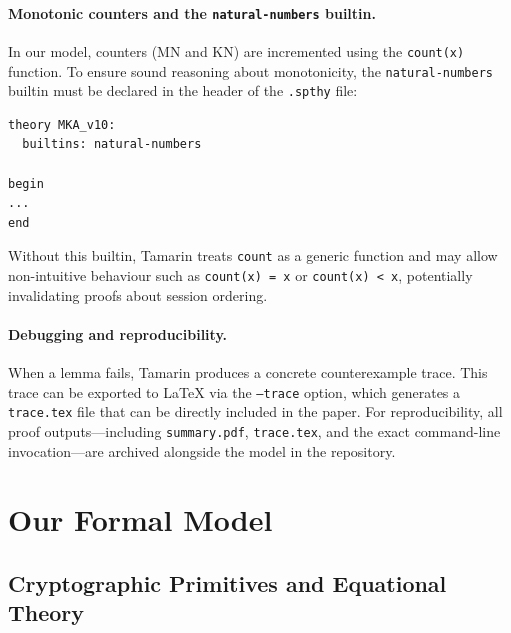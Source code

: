 \paragraph{Monotonic counters and the \texttt{natural-numbers} builtin.} In our model, counters (MN and KN) are incremented using the \texttt{count(x)} function. To ensure sound reasoning about monotonicity, the \texttt{natural-numbers} builtin must be declared in the header of the \texttt{.spthy} file:
\begin{verbatim}
theory MKA_v10:
  builtins: natural-numbers

begin
...
end
\end{verbatim}
Without this builtin, Tamarin treats \texttt{count} as a generic function and may allow non-intuitive behaviour such as \texttt{count(x) = x} or \texttt{count(x) < x}, potentially invalidating proofs about session ordering.

\paragraph{Debugging and reproducibility.} When a lemma fails, Tamarin produces a concrete counterexample trace. This trace can be exported to LaTeX via the \texttt{--trace} option, which generates a \texttt{trace.tex} file that can be directly included in the paper. For reproducibility, all proof outputs—including \texttt{summary.pdf}, \texttt{trace.tex}, and the exact command-line invocation—are archived alongside the model in the repository.

\section{Our Formal Model}
\label{sec:model}

\subsection{Cryptographic Primitives and Equational Theory}

